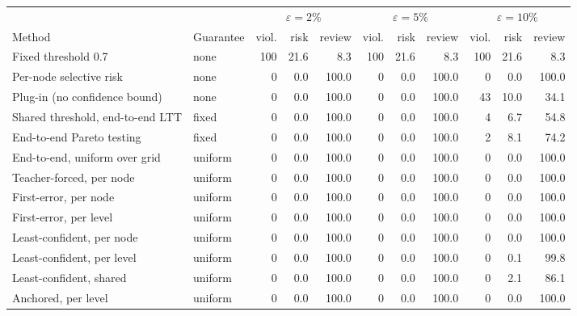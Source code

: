 \begin{tabular}{llrrrrrrrrr}
\toprule
 & & \multicolumn{3}{c}{$\varepsilon=2\%$} & \multicolumn{3}{c}{$\varepsilon=5\%$} & \multicolumn{3}{c}{$\varepsilon=10\%$} \\
\cmidrule(lr){3-5}\cmidrule(lr){6-8}\cmidrule(lr){9-11}
Method & Guarantee & viol. & risk & review & viol. & risk & review & viol. & risk & review \\
\midrule
Fixed threshold 0.7 & none & 100 & 21.6 & 8.3 & 100 & 21.6 & 8.3 & 100 & 21.6 & 8.3 \\
Per-node selective risk & none & 0 & 0.0 & 100.0 & 0 & 0.0 & 100.0 & 0 & 0.0 & 100.0 \\
Plug-in (no confidence bound) & none & 0 & 0.0 & 100.0 & 0 & 0.0 & 100.0 & 43 & 10.0 & 34.1 \\
\midrule
Shared threshold, end-to-end LTT & fixed & 0 & 0.0 & 100.0 & 0 & 0.0 & 100.0 & 4 & 6.7 & 54.8 \\
End-to-end Pareto testing & fixed & 0 & 0.0 & 100.0 & 0 & 0.0 & 100.0 & 2 & 8.1 & 74.2 \\
End-to-end, uniform over grid & uniform & 0 & 0.0 & 100.0 & 0 & 0.0 & 100.0 & 0 & 0.0 & 100.0 \\
\midrule
Teacher-forced, per node & uniform & 0 & 0.0 & 100.0 & 0 & 0.0 & 100.0 & 0 & 0.0 & 100.0 \\
First-error, per node & uniform & 0 & 0.0 & 100.0 & 0 & 0.0 & 100.0 & 0 & 0.0 & 100.0 \\
First-error, per level & uniform & 0 & 0.0 & 100.0 & 0 & 0.0 & 100.0 & 0 & 0.0 & 100.0 \\
\midrule
Least-confident, per node & uniform & 0 & 0.0 & 100.0 & 0 & 0.0 & 100.0 & 0 & 0.0 & 100.0 \\
Least-confident, per level & uniform & 0 & 0.0 & 100.0 & 0 & 0.0 & 100.0 & 0 & 0.1 & 99.8 \\
Least-confident, shared & uniform & 0 & 0.0 & 100.0 & 0 & 0.0 & 100.0 & 0 & 2.1 & 86.1 \\
Anchored, per level & uniform & 0 & 0.0 & 100.0 & 0 & 0.0 & 100.0 & 0 & 0.0 & 100.0 \\
\bottomrule
\end{tabular}
